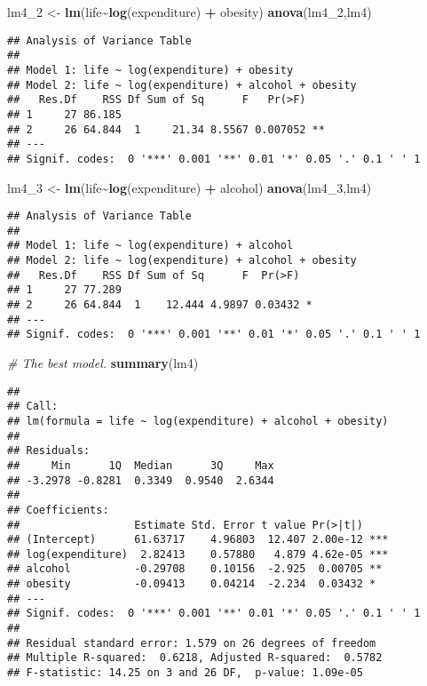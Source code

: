 \documentclass[
]{article}
\newenvironment{Shaded}{\begin{snugshade}}{\end{snugshade}}
\newcommand{\CommentTok}[1]{\textcolor[rgb]{0.56,0.35,0.01}{\textit{#1}}}
\newcommand{\FunctionTok}[1]{\textcolor[rgb]{0.13,0.29,0.53}{\textbf{#1}}}
\newcommand{\NormalTok}[1]{#1}
\newcommand{\OtherTok}[1]{\textcolor[rgb]{0.56,0.35,0.01}{#1}}
\newcommand{\SpecialCharTok}[1]{\textcolor[rgb]{0.81,0.36,0.00}{\textbf{#1}}}
\begin{document}
\begin{Shaded}
\begin{Highlighting}[]
\NormalTok{lm4\_2 }\OtherTok{\textless{}{-}} \FunctionTok{lm}\NormalTok{(life}\SpecialCharTok{\textasciitilde{}}\FunctionTok{log}\NormalTok{(expenditure) }\SpecialCharTok{+}\NormalTok{ obesity)}
\FunctionTok{anova}\NormalTok{(lm4\_2,lm4)}
\end{Highlighting}
\end{Shaded}

\begin{verbatim}
## Analysis of Variance Table
## 
## Model 1: life ~ log(expenditure) + obesity
## Model 2: life ~ log(expenditure) + alcohol + obesity
##   Res.Df    RSS Df Sum of Sq      F   Pr(>F)   
## 1     27 86.185                                
## 2     26 64.844  1     21.34 8.5567 0.007052 **
## ---
## Signif. codes:  0 '***' 0.001 '**' 0.01 '*' 0.05 '.' 0.1 ' ' 1
\end{verbatim}

\begin{Shaded}
\begin{Highlighting}[]
\NormalTok{lm4\_3 }\OtherTok{\textless{}{-}} \FunctionTok{lm}\NormalTok{(life}\SpecialCharTok{\textasciitilde{}}\FunctionTok{log}\NormalTok{(expenditure) }\SpecialCharTok{+}\NormalTok{ alcohol)}
\FunctionTok{anova}\NormalTok{(lm4\_3,lm4)}
\end{Highlighting}
\end{Shaded}

\begin{verbatim}
## Analysis of Variance Table
## 
## Model 1: life ~ log(expenditure) + alcohol
## Model 2: life ~ log(expenditure) + alcohol + obesity
##   Res.Df    RSS Df Sum of Sq      F  Pr(>F)  
## 1     27 77.289                              
## 2     26 64.844  1    12.444 4.9897 0.03432 *
## ---
## Signif. codes:  0 '***' 0.001 '**' 0.01 '*' 0.05 '.' 0.1 ' ' 1
\end{verbatim}

\begin{Shaded}
\begin{Highlighting}[]
\CommentTok{\# The best model.}
\FunctionTok{summary}\NormalTok{(lm4)}
\end{Highlighting}
\end{Shaded}

\begin{verbatim}
## 
## Call:
## lm(formula = life ~ log(expenditure) + alcohol + obesity)
## 
## Residuals:
##     Min      1Q  Median      3Q     Max 
## -3.2978 -0.8281  0.3349  0.9540  2.6344 
## 
## Coefficients:
##                  Estimate Std. Error t value Pr(>|t|)    
## (Intercept)      61.63717    4.96803  12.407 2.00e-12 ***
## log(expenditure)  2.82413    0.57880   4.879 4.62e-05 ***
## alcohol          -0.29708    0.10156  -2.925  0.00705 ** 
## obesity          -0.09413    0.04214  -2.234  0.03432 *  
## ---
## Signif. codes:  0 '***' 0.001 '**' 0.01 '*' 0.05 '.' 0.1 ' ' 1
## 
## Residual standard error: 1.579 on 26 degrees of freedom
## Multiple R-squared:  0.6218, Adjusted R-squared:  0.5782 
## F-statistic: 14.25 on 3 and 26 DF,  p-value: 1.09e-05
\end{verbatim}
\end{document}
